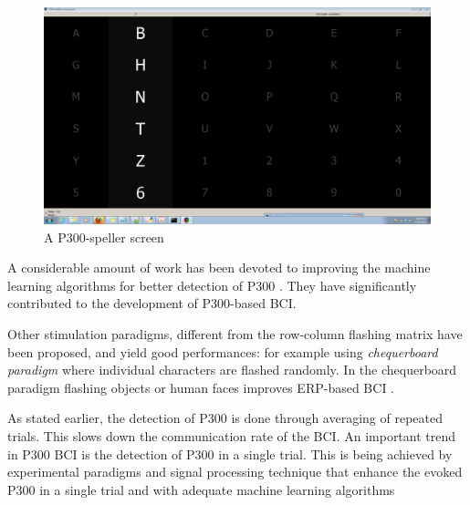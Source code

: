 \begin{figure}[!ht]
    \centering
    \includegraphics[width=0.5\columnwidth]{Figures/P300Speller.pdf}
    \caption{\footnotesize{A P300-speller screen} }
    \label{fig:P300speller}
\end{figure}

A considerable amount of work has been devoted to improving the machine learning algorithms for better detection of P300 \citep{hoffmann_boosting_2005,rakotomamonjy_ensemble_2005,zhang_p300_2007,krusienski_toward_2008,rivet_xdawn_2009,verschore_dynamic_2012,lenhardt_adaptive_2008,panicker_adaptation_2010}.
They have significantly contributed to the development of P300-based BCI.

Other stimulation paradigms, different from the row-column flashing matrix have been proposed, and yield good performances: for example using \emph{chequerboard paradigm} where individual characters are flashed randomly. 
In the chequerboard paradigm flashing objects or human faces improves ERP-based BCI \citep{hoffmann_efficient_2008,kaufmann_flashing_2011,kaufmann_face_2013,chen_survey_2015}. 

As stated earlier, the detection of P300 is done through averaging of repeated trials. This slows down the communication rate of the BCI.
An important trend in P300 BCI is the detection of P300 in a single trial. This is being achieved by experimental paradigms and signal processing technique that enhance the evoked P300 in a single trial and with adequate machine learning algorithms \citep{bayliss_single_1998,yin_novel_2013,ishita_development_2007,gucluturk_online_2010,kaufmann_comparison_2013} 

